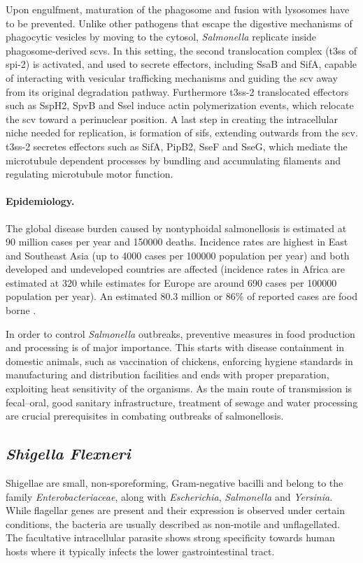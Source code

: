 Upon engulfment, maturation of the phagosome and fusion with lysosomes have to be prevented. Unlike other pathogens that escape the digestive mechanisms of phagocytic vesicles by moving to the cytosol, \textit{Salmonella} replicate inside phagosome-derived \glspl{scv}. In this setting, the second translocation complex (\gls{t3ss} of \acrshort{spi}-2) is activated, and used to secrete effectors, including SsaB and SifA, capable of interacting with vesicular trafficking mechanisms and guiding the \gls{scv} away from its original degradation pathway. Furthermore \gls{t3ss}-2 translocated effectors such as SspH2, SpvB and Ssel induce actin polymerization events, which relocate the \gls{scv} toward a perinuclear position. A last step in creating the intracellular niche needed for replication, is formation of \glspl{sif}, extending outwards from the \gls{scv}. \Gls{t3ss}-2 secretes effectors such as SifA, PipB2, SseF and SseG, which mediate the microtubule dependent processes by bundling and accumulating filaments and regulating microtubule motor function.

\paragraph{Epidemiology.}
The global disease burden caused by nontyphoidal salmonellosis is estimated at 90 million cases per year and 150000 deaths. Incidence rates are highest in East and Southeast Asia (up to 4000 cases per 100000 population per year) and both developed and undeveloped countries are affected (incidence rates in Africa are estimated at 320 while estimates for Europe are around 690 cases per 100000 population per year). An estimated 80.3 million or 86\% of reported cases are food borne \citep{Majowicz2010}.

In order to control \textit{Salmonella} outbreaks, preventive measures in food production and processing is of major importance. This starts with disease containment in domestic animals, such as vaccination of chickens, enforcing  hygiene standards in manufacturing and distribution facilities and ends with proper preparation, exploiting heat sensitivity of the organisms. As the main route of transmission is fecal--oral, good sanitary infrastructure, treatment of sewage and water processing are crucial prerequisites in combating outbreaks of salmonellosis.

\subsection{\textit{Shigella Flexneri}}
Shigellae are small, non-sporeforming, Gram-negative bacilli and belong to the family \textit{Enterobacteriaceae}, along with \textit{Escherichia}, \textit{Salmonella} and \textit{Yersinia}. While flagellar genes are present and their expression is observed under certain conditions, the bacteria are usually described as non-motile and unflagellated. The facultative intracellular parasite shows strong specificity towards human hosts where it typically infects the lower gastrointestinal tract.

